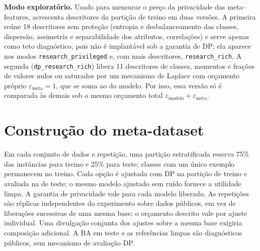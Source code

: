 \textbf{Modo exploratório.} Usado para mensurar o preço da privacidade das meta-features, acrescenta descritores da partição de treino em duas versões. A primeira reúne 18 descritores sem proteção (entropia e desbalanceamento das classes, dispersão, assimetria e separabilidade dos atributos, correlações) e serve apenas como teto diagnóstico, pois não é implantável sob a garantia de DP; ela aparece nos modos \texttt{research\_privileged} e, com mais descritores, \texttt{research\_rich}. A segunda (\texttt{dp\_research\_rich}) libera 11 descritores de classes, momentos e frações de valores nulos ou saturados por um mecanismo de Laplace com orçamento próprio $\varepsilon_{\text{meta}} = 1$, que se soma ao do modelo. Por isso, essa versão só é comparada às demais sob o mesmo orçamento total $\varepsilon_{\text{modelo}} + \varepsilon_{\text{meta}}$.

\section{Construção do meta-dataset}
\label{sec:meta-dataset}

Em cada conjunto de dados e repetição, uma partição estratificada reserva 75\% das instâncias para treino e 25\% para teste; classes com um único exemplo permanecem no treino. Cada opção é ajustada com DP na partição de treino e avaliada na de teste; o mesmo modelo ajustado sem ruído fornece a utilidade limpa. A garantia de privacidade vale para cada modelo liberado. As repetições são réplicas independentes do experimento sobre dados públicos, em vez de liberações sucessivas de uma mesma base; o orçamento descrito vale por ajuste individual. Uma divulgação conjunta dos ajustes sobre a mesma base exigiria composição adicional. A BA em teste e as referências limpas são diagnósticos públicos, sem mecanismo de avaliação DP.

